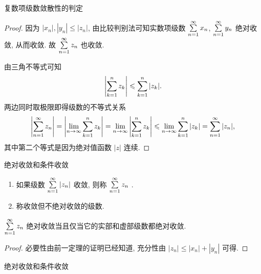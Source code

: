 \begin{frame}{复数项级数敛散性的判定}
\beqskip{7pt}
\begin{proof}
\indent
因为 $|x_n|,|y_n|\le|z_n|$, 由比较判别法可知实数项级数 $\sum\limits_{n=1}^\infty x_n$, $\sum\limits_{n=1}^\infty y_n$ 绝对收敛, 从而收敛.
\onslide<+->
故 $\sum\limits_{n=1}^\infty z_n$ 也收敛.

\onslide<+->
\indent
由三角不等式可知
\[\left|\sum_{k=1}^n z_k\right|\leqslant \sum_{k=1}^n|z_k|.\]
\onslide<+->
两边同时取极限即得级数的不等式关系
\[\left|\sum_{n=1}^\infty z_n\right|=\left|\lim_{n\to\infty}\sum_{k=1}^n z_k\right|=
\lim_{n\to\infty}\left|\sum_{k=1}^n z_k\right|\leqslant\lim_{n\to\infty}\sum_{k=1}^n|z_k|=\sum_{n=1}^\infty |z_n|,\]
\onslide<+->
其中第二个等式是因为绝对值函数 $|z|$ 连续.
\end{proof}
\endgroup
\end{frame}


\begin{frame}{绝对收敛和条件收敛}
\begin{definition}
\begin{enumerate}
\item 如果级数 $\sum\limits_{n=1}^\infty |z_n|$ 收敛, 则称 $\sum\limits_{n=1}^\infty z_n$ .
\item 称收敛但不绝对收敛的级数.
\end{enumerate}
\end{definition}
\begin{theorem}
$\sum\limits_{n=1}^\infty z_n$ 绝对收敛当且仅当它的实部和虚部级数都绝对收敛.
\end{theorem}
\begin{proof}
必要性由前一定理的证明已经知道,
\onslide<+->
充分性由 $|z_n|\le|x_n|+|y_n|$ 可得.
\end{proof}
\end{frame}


\begin{frame}{绝对收敛和条件收敛}
\begin{center}
\renewcommand\arraystretch{2}
\end{center}
\end{frame}


